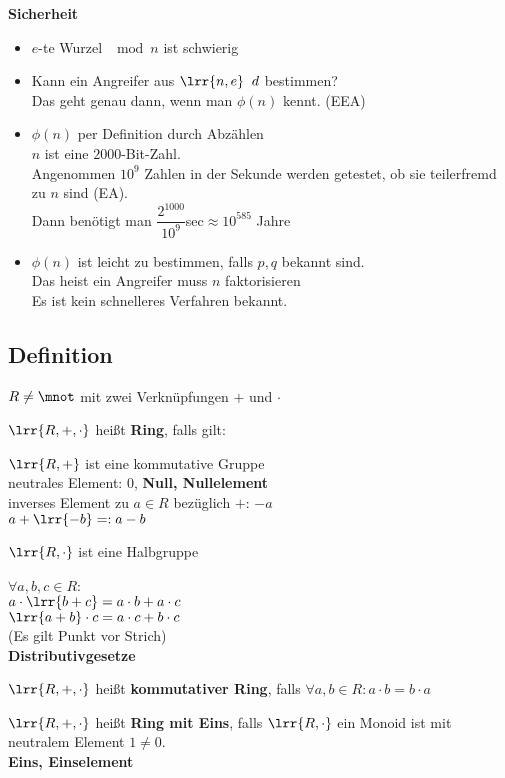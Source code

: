 	\textbf{Sicherheit}
	\begin{itemize}
		\item $e$-te Wurzel $\mod n$ ist schwierig
		\item Kann ein Angreifer aus $\lrr{n,e}\;\;d$ bestimmen?\\
			Das geht genau dann, wenn man $\phi(n)$ kennt. (EEA)
		\item $\phi(n)$ per Definition durch Abzählen\\
			$n$ ist eine $2000$-Bit-Zahl.\\
			Angenommen $10^9$ Zahlen in der Sekunde werden getestet, ob sie teilerfremd zu $n$ sind (EA).\\
			Dann benötigt man $\dfrac{2^1000}{10^9}$sec$\approx 10^{585}$ Jahre
		\item $\phi(n)$ ist leicht zu bestimmen, falls $p,q$ bekannt sind.\\
			Das heist ein Angreifer muss $n$ faktorisieren\\
			Es ist kein schnelleres Verfahren bekannt.
	\end{itemize}
\subsection{Definition}
	$R\neq\mnot$ mit zwei Verknüpfungen $+$ und $\cdot$
		\item $\lrr{R,+,\cdot}$ heißt \textbf{Ring}, falls gilt:
				\item $\lrr{R,+}$ ist eine kommutative Gruppe\\
					neutrales Element: 0, \textbf{Null, Nullelement}\\
					inverses Element zu $a\in R$ bezüglich $+$: $-a$\\
					$a+\lrr{-b} =: a-b$
				\item $\lrr{R,\cdot}$ ist eine Halbgruppe
					\\ %
				\item $\forall a,b,c\in R$:\\
					$a\cdot\lrr{b+c}=a\cdot b+a\cdot c$\\
					$\lrr{a+b}\cdot c=a\cdot c+b\cdot c$\\
					(Es gilt Punkt vor Strich)\\
					\textbf{Distributivgesetze}
			\subExEnd
		\item $\lrr{R,+,\cdot}$ heißt \textbf{kommutativer Ring}, falls $\forall a,b\in R:a\cdot b=b\cdot a$
		\item $\lrr{R,+,\cdot}$ heißt \textbf{Ring mit Eins}, falls $\lrr{R,\cdot}$ ein Monoid ist mit neutralem Element $1\neq 0$.\\
			\textbf{Eins, Einselement}
	\subExEnd
